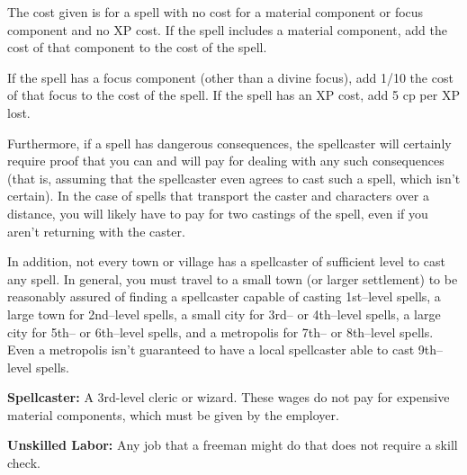 The cost given is for a spell with no cost for a material component or focus component and no XP cost. If the spell includes a material component, add the cost of that component to the cost of the spell.

If the spell has a focus component (other than a divine focus), add 1/10 the cost of that focus to the cost of the spell. If the spell has an XP cost, add 5 cp per XP lost.

Furthermore, if a spell has dangerous consequences, the spellcaster will certainly require proof that you can and will pay for dealing with any such consequences (that is, assuming that the spellcaster even agrees to cast such a spell, which isn't certain). In the case of spells that transport the caster and characters over a distance, you will likely have to pay for two castings of the spell, even if you aren't returning with the caster.

In addition, not every town or village has a spellcaster of sufficient level to cast any spell. In general, you must travel to a small town (or larger settlement) to be reasonably assured of finding a spellcaster capable of casting 1st--level spells, a large town for 2nd--level spells, a small city for 3rd-- or 4th--level spells, a large city for 5th-- or 6th--level spells, and a metropolis for 7th-- or 8th--level spells. Even a metropolis isn't guaranteed to have a local spellcaster able to cast 9th--level spells.

\textbf{Spellcaster:} A 3rd-level cleric or wizard. These wages do not pay for expensive material components, which must be given by the employer.

\textbf{Unskilled Labor:} Any job that a freeman might do that does not require a skill check.

